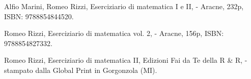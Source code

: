
\begin{etaremune}
\vspace{-3.0mm}
  \item {\sc Alfio Marini, Romeo Rizzi},
   \newblock  Eserciziario di matematica I e II,
    - Aracne, 232p, ISBN: 9788854844520.
\vspace{-3.0mm}
  \item {\sc Romeo Rizzi},
   \newblock  Eserciziario di matematica vol. 2,
    - Aracne, 156p, ISBN: 9788854827332.
\vspace{-3.0mm}
  \item {\sc Romeo Rizzi},
   \newblock  Eserciziario di matematica II,
   \newblock Edizioni Fai da Te della R \& R,
    - stampato dalla Global Print in Gorgonzola (MI).
\end{etaremune}

